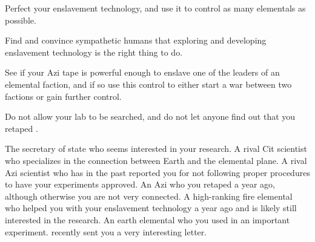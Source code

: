\documentclass[char]{elementals}
\begin{document}
\begin{itemz}[Goals]
  \item Perfect your enslavement technology, and use it to control as many elementals as possible.
  \item Find and convince sympathetic humans that exploring and developing enslavement technology is the right thing to do.
  \item See if your Azi tape is powerful enough to enslave one of the leaders of an elemental faction, and if so use this control to either start a war between two factions or gain further control.
  \item Do not allow your lab to be searched, and do not let anyone find out that you retaped \cDiplomat{}.
\end{itemz}

\begin{contacts}
  \contact{\cDema{}} The secretary of state who seems interested in your research.
	\contact{\cGD{}} A rival Cit scientist who specializes in the connection between Earth and the elemental plane.
	\contact{\cScientist{}} A rival Azi scientist who has in the past reported you for not following proper procedures to have your experiments approved.
	\contact{\cDiplomat{}} An Azi who you retaped a year ago, although otherwise you are not very connected.
	\contact{\cPyro{}} A high-ranking fire elemental who helped you with your enslavement technology a year ago and is likely still interested in the research.
	\contact{\cMinion{}} An earth elemental who you used in an important experiment. \cMinion{\They} recently sent you a very interesting letter.
\end{contacts}
\end{document}
